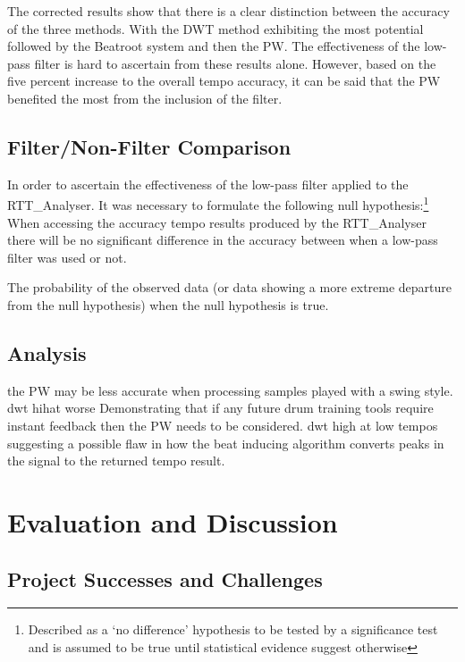 \documentclass[a4paper, 11pt]{article}
\begin{document}
The corrected results show that there is a clear distinction between the accuracy of the three methods. With the DWT method exhibiting the most potential followed by the Beatroot system and then the PW. The effectiveness of the low-pass filter is hard to ascertain from these results alone. However, based on the five percent increase to the overall tempo accuracy, it can be said that the PW benefited the most from the inclusion of the filter.

\subsection{Filter/Non-Filter Comparison}
In order to ascertain the effectiveness of the low-pass filter applied to the RTT\_Analyser. It was necessary to formulate the following null hypothesis:\footnote{Described as a ‘no difference’ hypothesis to be tested by a significance test\cite{cambdic} and is assumed to be true until statistical evidence suggest otherwise} When accessing the accuracy tempo results produced by the RTT\_Analyser there will be no significant difference in the accuracy between when a low-pass filter was used or not.

The probability of the observed data (or data showing a more extreme departure from the null
hypothesis) when the null hypothesis is true. 

\subsection{Analysis}
the PW may be less accurate when processing samples played with a swing style.
dwt hihat worse
Demonstrating that if any future drum training tools require instant feedback then the PW needs to be considered.
dwt high  at low tempos
suggesting a possible flaw in how the beat inducing algorithm converts peaks in the signal to the returned tempo result.

\clearpage
\maketitle \section{Evaluation and Discussion}

\subsection{Project Successes and Challenges}
\end{document}

